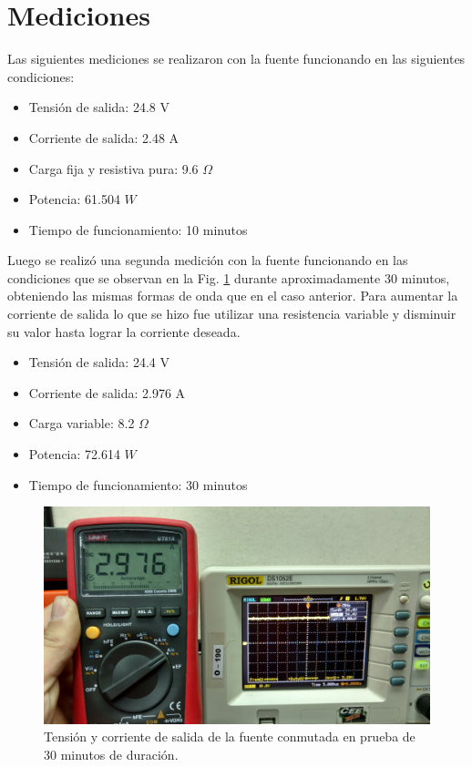 \documentclass[11pt, a4paper]{article}
\begin{document}
\section{Mediciones}
Las siguientes mediciones se realizaron con la fuente funcionando en las siguientes condiciones:
\begin{itemize}
	\item Tensión de salida: 24.8 V
	\item Corriente de salida: 2.48 A
	\item Carga fija y resistiva pura: 9.6 $\Omega$
	\item Potencia: 61.504 $W$
	\item Tiempo de funcionamiento: 10 minutos	
\end{itemize}

Luego se realizó una segunda medición con la fuente funcionando en las condiciones que se observan en la Fig. \ref{VIfunc} durante aproximadamente 30 minutos, obteniendo las mismas formas de onda que en el caso anterior. Para aumentar la corriente de salida lo que se hizo fue utilizar una resistencia variable y disminuir su valor hasta lograr la corriente deseada.
\begin{itemize}
	\item Tensión de salida: 24.4 V
	\item Corriente de salida: 2.976 A
	\item Carga variable: 8.2 $\Omega$
	\item Potencia: 72.614 $W$
	\item Tiempo de funcionamiento: 30 minutos	
\end{itemize}

\begin{figure}[h]
	\centering
	\includegraphics[width = 8 cm]{Imagenes/VIfunc}
	\caption{Tensión y corriente de salida de la fuente conmutada en prueba de 30 minutos de duración.}
	\label{VIfunc}
\end{figure}
\end{document}
